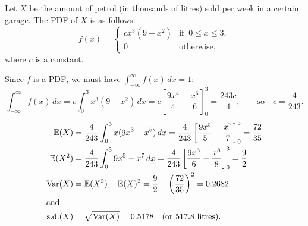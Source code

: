 \begin{exercise}
\begin{questions}
%



\question
Let $X$ be the amount of petrol (in thousands of litres) sold per week in a certain garage. The PDF of $X$ is as follows:
\[
f(x) = \begin{cases}
	cx^3(9-x^2)	& \text{if }\ 0\leq x\leq 3,\\
	0			& \text{otherwise,}		
\end{cases}
\]
where $c$ is a constant. 
\begin{answer}
Since $f$ is a PDF, we must have $\int_{-\infty}^{\infty} f(x)\,dx = 1$:
\[
\int_{-\infty}^{\infty} f(x)\,dx 
	= c\int_0^3 x^3(9-x^2)\,dx 
	= c\left[\frac{9x^4}{4}-\frac{x^6}{6}\right]_0^3
	= \frac{243c}{4}, \qquad\text{so}\quad c = \frac{4}{243}.
\]
\begin{align*}
\mathbb{E}(X) 
	& = \frac{4}{243}\int_0^3 x(9x^3-x^5)\,dx 
	= \frac{4}{243}\left[\frac{9x^5}{5}-\frac{x^7}{7}\right]_0^3
	= \frac{72}{35} \\
\mathbb{E}(X^2) 
	& = \frac{4}{243}\int_0^3 9x^5-x^7\,dx 
	= \frac{4}{243}\left[\frac{9x^6}{6}-\frac{x^8}{8}\right]_0^3
	= \frac{9}{2} \\
\text{Var}(X) 
	& = \mathbb{E}(X^2)-\mathbb{E}(X)^2 
	= \frac{9}{2} - \left(\frac{72}{35}\right)^2 
	= 0.2682. \\
\intertext{and}	
\text{s.d.}(X)
	& = \sqrt{\text{Var}(X)} = 0.5178\quad\text{(or $517.8$ litres).}
\end{align*}
\end{answer}




\end{questions}
\end{exercise}
